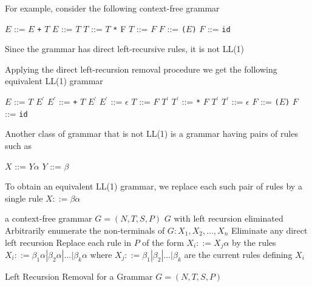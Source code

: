 \documentclass[8pt,a4paper,compress]{beamer}
\newcommand{\mm}[1]{$#1$}
\newcommand{\expo}[2]{$#1^{#2}$}
\newenvironment{spaced}
{
\smallskip
\hspace{.5cm}
\begin{minipage}[c]{\textwidth}
}
{
\end{minipage}
\smallskip
}
\begin{document}
\begin{frame}[fragile]
\pause

For example, consider the following context-free grammar

\text{ }
\begin{spaced}
\begin{production}
\mm{E} ::= \mm{E} \lstinline{+} \mm{T}
\mm{E} ::= \mm{T}
\mm{T} ::= \mm{T} \lstinline{*} {F}
\mm{T} ::= \mm{F}
\mm{F} ::= \lstinline{(}\mm{E}\lstinline{)}
\mm{F} ::= \lstinline{id}
\end{production}
\end{spaced}

\pause

Since the grammar has direct left-recursive rules, it is not LL(1)

\pause
\bigskip

Applying the direct left-recursion removal procedure we get the following equivalent LL(1) grammar

\text{ }
\begin{spaced}
\begin{production}
\mm{E}  ::= \mm{T} \expo{E}{\prime}
\expo{E}{\prime} ::= \lstinline{+} \mm{T} \expo{E}{\prime}
\expo{E}{\prime} ::= \mm{\epsilon}
\mm{T}  ::= \mm{F} \expo{T}{\prime}
\expo{T}{\prime} ::= \lstinline{*} \mm{F} \expo{T}{\prime}
\expo{T}{\prime} ::= \mm{\epsilon}
\mm{F}  ::= \lstinline{(}\mm{E}\lstinline{)}
\mm{F}  ::= \lstinline{id}
\end{production}
\end{spaced}
\end{frame}

\begin{frame}[fragile]
\pause

Another class of grammar that is not LL(1) is a grammar having pairs of rules such as

\text{ }
\begin{spaced}
\begin{production}
\mm{X}  ::= \mm{Y\alpha}
\mm{Y}  ::= \mm{\beta}
\end{production}
\end{spaced}

\pause

To obtain an equivalent LL(1) grammar, we replace each such pair of rules by a single rule $X ::= \beta\alpha$

\pause
\bigskip

\begin{algorithm}[H]
\begin{algorithmic}
\REQUIRE a context-free grammar $G=(N,T,S,P)$
\ENSURE $G$ with left recursion eliminated
\STATE Arbitrarily enumerate the non-terminals of $G: X_1, X_2, \dots, X_n$
\STATE Eliminate any direct left recursion
\STATE Replace each rule in $P$ of the form $X_i::= X_j\alpha$ by the rules $X_i ::= \beta_1\alpha | \beta_2\alpha | \dots | \beta_k\alpha$ where $X_j ::= \beta_1 | \beta_2 | \dots | \beta_k$ are the current rules defining $X_i$
\ENDFOR
\ENDFOR
\end{algorithmic}
\caption{Left Recursion Removal for a Grammar $G=(N,T,S,P)$}
\end{algorithm}
\end{frame}
\end{document}
